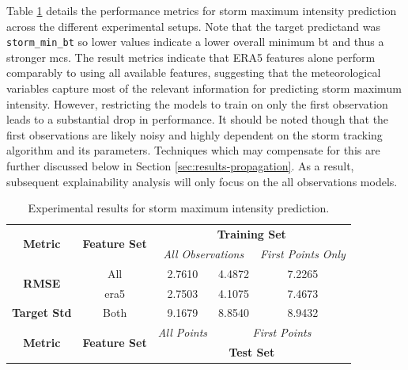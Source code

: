 Table \ref{tab:storm_max_intensity_results} details the performance metrics for storm maximum intensity prediction across the different experimental setups. Note that the target predictand was \texttt{storm\_min\_bt} so lower values indicate a lower overall minimum \acrshort{bt} and thus a stronger \acrshort{mcs}. The result metrics indicate that ERA5 features alone perform comparably to using all available features, suggesting that the meteorological variables capture most of the relevant information for predicting storm maximum intensity. However, restricting the models to train on only the first observation leads to a substantial drop in performance. It should be noted though that the first observations are likely noisy and highly dependent on the storm tracking algorithm and its parameters. Techniques which may compensate for this are further discussed below in Section \ref{sec:results-propagation}. As a result, subsequent explainability analysis will only focus on the all observations models.

\begin{table}[ht]
\centering
\caption{Experimental results for storm maximum intensity prediction.}
\label{tab:storm_max_intensity_results}
\begin{tabular}{|c|c|c|c|c|}
\hline
\multirow{2}{*}{\textbf{Metric}} & \multirow{2}{*}{\textbf{Feature Set}} & \multicolumn{3}{c|}{\textbf{Training Set} } \\ \cline{3-5}
 & & \multicolumn{2}{c|}{\textit{All Observations}} & \textit{First Points Only} \\
\hline \hline
\multirow{2}{*}{\textbf{RMSE}} & All & 2.7610 & 4.4872 & 7.2265 \\
 & \acrshort{era5} & 2.7503 & 4.1075 & 7.4673 \\
\hline
\textbf{Target Std} & Both & 9.1679 & 8.8540 & 8.9432 \\
\hline \hline
\multirow{2}{*}{\textbf{Metric}} & \multirow{2}{*}{\textbf{Feature Set}} & \textit{All Points} & \multicolumn{2}{c|}{\textit{First Points}} \\ \cline{3-5}
 & & \multicolumn{3}{c|}{\textbf{Test Set}} \\ 
\hline
\end{tabular}
\end{table}

